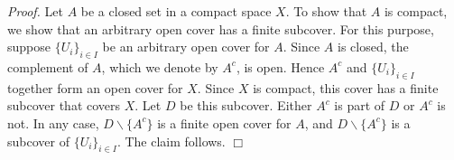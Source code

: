 \documentclass[12pt]{article}
\begin{document}
\emph{Proof.} Let $A$ be a closed set in a compact space $X$. 
To show that $A$ is compact, we show that an arbitrary open cover has
a finite subcover. For this purpose, suppose
$\{U_i\}_{i\in I}$ be an arbitrary open cover for $A$. 
Since $A$ is closed, the complement of $A$, 
which we denote by $A^c$, is open. 
Hence
$A^c$ and $\{U_i\}_{i\in I}$ together form an open cover for $X$. 
Since $X$ is compact, this cover has a finite subcover that
covers $X$. Let $D$ be this subcover. 
Either $A^c$ is part of $D$ or $A^c$ is not. 
In any case, $D\backslash\{A^c\}$ is a finite open cover
for $A$, and $D\backslash\{A^c\}$
is a subcover of $\{U_i\}_{i\in I}$. The claim follows. $\Box$
\end{document}
